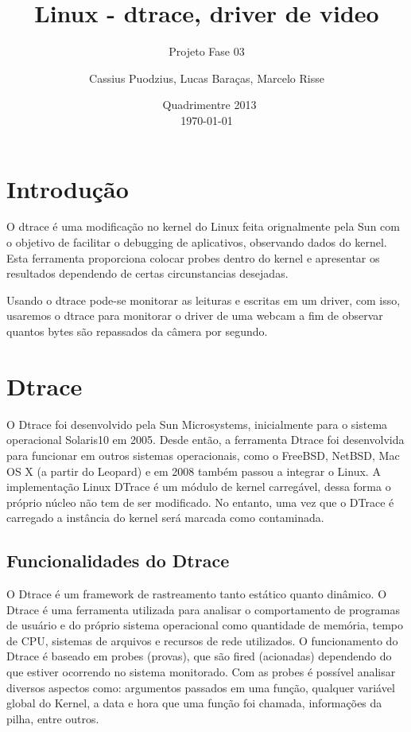\documentclass[a4paper]{scrartcl}
\title{Linux - dtrace, driver de video}
\subtitle{Projeto Fase 03}
\author{Cassius Puodzius, Lucas Baraças, Marcelo Risse}
\date{\segundo~Quadrimentre 2013\\\today}
\begin{document}
\maketitle

\begin{abstract}
\end{abstract}

\tableofcontents
\pagebreak[4]

\section{Introdução}

O dtrace é uma modificação no kernel do Linux feita orignalmente pela Sun com o objetivo de facilitar o debugging de aplicativos, observando dados do kernel. Esta ferramenta proporciona colocar probes dentro do kernel e apresentar os resultados dependendo de certas circunstancias desejadas.

Usando o dtrace pode-se monitorar as leituras e escritas em um driver, com isso, usaremos o dtrace para monitorar o driver de uma webcam a fim de observar quantos bytes são repassados da câmera por segundo.

\section{Dtrace}

O Dtrace foi desenvolvido pela Sun Microsystems, inicialmente para o sistema operacional Solaris10 em 2005. Desde então, a ferramenta Dtrace foi desenvolvida para funcionar em outros sistemas operacionais, como o FreeBSD, NetBSD, Mac OS X (a partir do Leopard) e em 2008 também passou a integrar o Linux. 
A implementação Linux DTrace é um módulo de kernel carregável, dessa forma o próprio núcleo não tem de ser modificado. No entanto, uma vez que o DTrace é carregado a instância do kernel será marcada como contaminada.

\subsection{Funcionalidades do Dtrace}

O Dtrace é um framework de rastreamento tanto estático quanto dinâmico. O Dtrace é uma ferramenta utilizada para analisar o comportamento de programas de usuário e do próprio sistema operacional como quantidade de memória, tempo de CPU, sistemas de arquivos e recursos de rede utilizados. 
O funcionamento do Dtrace é baseado em probes (provas), que são fired (acionadas) dependendo do que estiver ocorrendo no sistema monitorado. Com as probes é possível analisar diversos aspectos como: argumentos passados em uma função, qualquer variável global do Kernel, a data e hora que uma função foi chamada, informações da pilha, entre outros.
\end{document}
